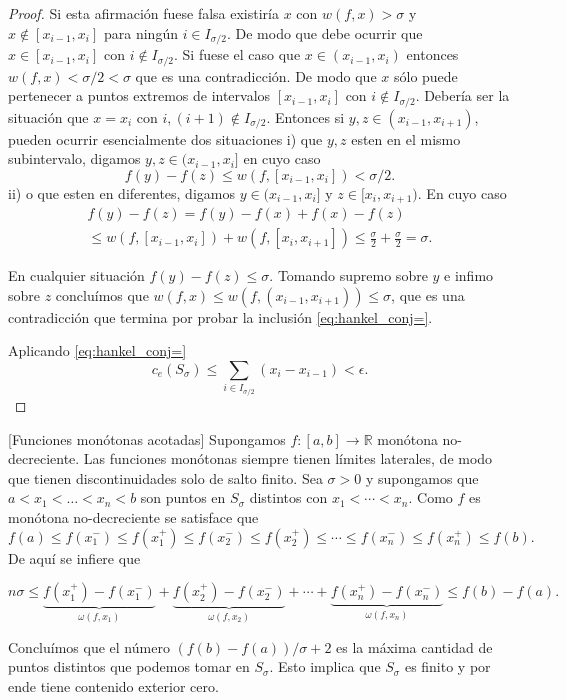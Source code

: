 \begin{proof}
Si esta afirmación fuese falsa existiría $x$ con $w(f,x)>\sigma$ y $x\notin [x_{i-1},x_i]$ para ningún $i\in I_{\sigma/2}$. De modo que debe ocurrir que $x\in   [x_{i-1},x_i]$ con $i\notin I_{\sigma/2}$. Si fuese el caso que  $x\in   (x_{i-1},x_i)$ entonces  $w(f,x)<\sigma/2<\sigma$ que es una contradicción. De modo que $x$ sólo puede pertenecer a puntos extremos de intervalos  $[x_{i-1},x_i]$ con  $i\notin I_{\sigma/2}$. Debería ser la situación que $x=x_i$ con $i,(i+1)\notin I_{\sigma/2}$. Entonces si $y,z  \in (x_{i-1},x_{i+1})$,  pueden ocurrir esencialmente dos situaciones i) que $y,z$ esten en el mismo subintervalo, digamos  $y,z \in (x_{i-1},x_{i}]$ en cuyo caso
\[
 f(y)-f(z)\leq w(f, [x_{i-1},x_{i}])<\sigma/2.
\]
ii) o que esten en diferentes, digamos $y\in  (x_{i-1},x_{i}]$ y $z \in [x_{i},x_{i+1})$. En cuyo caso
\begin{multline*}
 f(y)-f(z)=f(y)-f(x)+f(x)-f(z)\\
 \leq w(f,[x_{i-1},x_i])+w(f,[x_{i},x_{i+1}])\leq\frac{\sigma}{2}+\frac{\sigma}{2}=\sigma.
\end{multline*}

En cualquier situación $f(y)-f(z)\leq\sigma$. Tomando supremo sobre $y$ e infimo sobre $z$ concluímos que $w(f,x)\leq w(f,(x_{i-1},x_{i+1}))\leq \sigma$, que es una contradicción que termina por probar la inclusión  \eqref{eq:hankel_conj=}. 

Aplicando \eqref{eq:hankel_conj=}
\[
 c_e(S_{\sigma})\leq  \sum_{i\in I_{\sigma/2}}(x_i-x_{i-1})<\epsilon.
\] 
\end{proof}


\begin{ejemplo}{}[Funciones monótonas acotadas] Supongamos $f:[a,b]\to\mathbb{R}$ monótona no-decreciente.    Las funciones monótonas siempre tienen límites laterales, de modo que   tienen discontinuidades solo de salto finito. Sea $\sigma>0$ y supongamos 
que $a<x_1<\ldots<x_n<b$ son puntos en $S_\sigma$ distintos con $x_1<\cdots < x_n$. Como $f$ es monótona no-decreciente se satisface que
\[
 f(a)\leq f(x_1^-) \leq f(x_1^+)\leq f(x_2^-) \leq f(x_2^+)\leq\cdots \leq f(x_n^-) \leq f(x_n^+)\leq f(b).
\]
De aquí se infiere que 

$$n\sigma \leq \underbrace{f(x_1^+) -f(x_1^-)}_{\omega(f,x_1)} + \underbrace{f(x_2^+) - f(x_2^-)}_{\omega(f,x_2)}+\cdots + \underbrace{f(x_n^+) -f(x_n^-)}_{\omega(f,x_n)}\leq f(b)-f(a).
$$

Concluímos que el número $(f(b)-f(a))/\sigma+2$  es la máxima cantidad de puntos distintos que podemos tomar en $S_\sigma$. Esto implica que $S_\sigma$ es finito y por ende tiene contenido exterior cero.  

 
\end{ejemplo}

